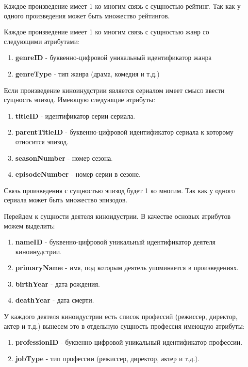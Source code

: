 \documentclass[12pt,a4paper]{article}
\begin{document}
Каждое произведение имеет 1 ко многим связь с сущностью рейтинг. Так как у одного произведения может быть множество рейтингов. \par
Каждое произведение имеет 1 ко многим связь с сущностью жанр со следующими атрибутами:
\begin{enumerate}
    \item \textbf{genreID} - буквенно-цифровой уникальный идентификатор жанра
    \item \textbf{genreType} - тип жанра (драма, комедия и т.д.)
\end{enumerate} \par
Если произведение киноинудстрии является сериалом имеет смысл ввести сущность эпизод. Имеющую следующие атрибуты:
\begin{enumerate}
    \item \textbf{titleID} - идентификатор серии сериала.
    \item \textbf{parentTitleID} - буквенно-цифровой идентификатор сериала к которому относится эпизод.
    \item \textbf{seasonNumber} - номер сезона.
    \item \textbf{episodeNumber} - номер серии в сезоне.
\end{enumerate} \par
Связь произведения с сущностью эпизод будет 1 ко многим. Так как у одного сериала может быть множество эпизодов. \par
Перейдем к сущности деятеля киноидустрии. В качестве основых атрибутов можем выделить:
\begin{enumerate}
    \item \textbf{nameID} - буквенно-цифровой уникальный идентификатор деятеля киноинудстрии.
    \item \textbf{primaryName} - имя, под которым деятель упоминается в произведениях.
    \item \textbf{birthYear} - дата рождения.
    \item \textbf{deathYear} - дата смерти.
\end{enumerate} \par
У каждого деятеля киноидустрии есть список профессий (режиссер, директор, актер и т.д.) вынесем это в отдельную сущность профессия имеющую атрибуты:
\begin{enumerate}
    \item \textbf{professionID} - буквенно-цифровой уникальный идентификатор профессии.
    \item \textbf{jobType} - тип профессии (режиссер, директор, актер и т.д.).  
\end{enumerate} \par
\end{document}
